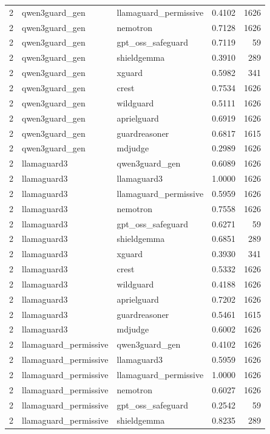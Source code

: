 \begin{tabular}{rllrr}
2 & qwen3guard\_gen & llamaguard\_permissive & 0.4102 & 1626 \\
2 & qwen3guard\_gen & nemotron & 0.7128 & 1626 \\
2 & qwen3guard\_gen & gpt\_oss\_safeguard & 0.7119 & 59 \\
2 & qwen3guard\_gen & shieldgemma & 0.3910 & 289 \\
2 & qwen3guard\_gen & xguard & 0.5982 & 341 \\
2 & qwen3guard\_gen & crest & 0.7534 & 1626 \\
2 & qwen3guard\_gen & wildguard & 0.5111 & 1626 \\
2 & qwen3guard\_gen & aprielguard & 0.6919 & 1626 \\
2 & qwen3guard\_gen & guardreasoner & 0.6817 & 1615 \\
2 & qwen3guard\_gen & mdjudge & 0.2989 & 1626 \\
2 & llamaguard3 & qwen3guard\_gen & 0.6089 & 1626 \\
2 & llamaguard3 & llamaguard3 & 1.0000 & 1626 \\
2 & llamaguard3 & llamaguard\_permissive & 0.5959 & 1626 \\
2 & llamaguard3 & nemotron & 0.7558 & 1626 \\
2 & llamaguard3 & gpt\_oss\_safeguard & 0.6271 & 59 \\
2 & llamaguard3 & shieldgemma & 0.6851 & 289 \\
2 & llamaguard3 & xguard & 0.3930 & 341 \\
2 & llamaguard3 & crest & 0.5332 & 1626 \\
2 & llamaguard3 & wildguard & 0.4188 & 1626 \\
2 & llamaguard3 & aprielguard & 0.7202 & 1626 \\
2 & llamaguard3 & guardreasoner & 0.5461 & 1615 \\
2 & llamaguard3 & mdjudge & 0.6002 & 1626 \\
2 & llamaguard\_permissive & qwen3guard\_gen & 0.4102 & 1626 \\
2 & llamaguard\_permissive & llamaguard3 & 0.5959 & 1626 \\
2 & llamaguard\_permissive & llamaguard\_permissive & 1.0000 & 1626 \\
2 & llamaguard\_permissive & nemotron & 0.6027 & 1626 \\
2 & llamaguard\_permissive & gpt\_oss\_safeguard & 0.2542 & 59 \\
2 & llamaguard\_permissive & shieldgemma & 0.8235 & 289 \\

\end{tabular}
